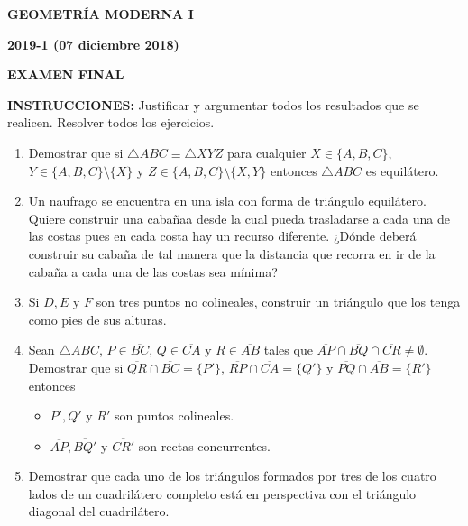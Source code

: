 \documentclass[10pt]{report}
\begin{document}
\vspace{3cm}


\begin{center}
\textbf{\LARGE {GEOMETRÍA MODERNA I}}
\end{center}

\begin{center}
\textbf{{\large 2019-1 (07 diciembre 2018)}}
\end{center}

\begin{center}
\textbf{{\large EXAMEN FINAL}}
\end{center}

{\bf INSTRUCCIONES:} Justificar y argumentar todos los resultados que se realicen. Resolver todos los ejercicios.

\begin{enumerate}

\item Demostrar que si $\triangle ABC \equiv \triangle XYZ$ para cualquier $X \in \{A,B,C\}$, $Y \in \{A,B,C\}\setminus \{X\}$ y $Z \in \{A,B,C\}\setminus\{X,Y\}$ entonces $\triangle ABC$ es equilátero.

\item Un naufrago se encuentra en una isla con forma de triángulo equilátero. Quiere construir una
cabañaa desde la cual pueda trasladarse a cada una de las costas pues en cada costa hay un
recurso diferente. ¿Dónde deberá construir su cabaña de tal manera que la distancia que
recorra en ir de la cabaña a cada una de las costas sea mínima?

\item Si $D, E$ y $F$ son tres puntos no colineales, construir un triángulo que los tenga como pies de sus alturas.

\item Sean $\triangle ABC$, $P \in \overline{BC}$, $Q \in \overline{CA}$ y $R \in \overline{AB}$ tales que $\overline{AP}\cap \overline{BQ}\cap \overline{CR}\neq \emptyset$. Demostrar que si $\overline{QR} \cap \overline {BC}= \{P'\}$, $\overline{RP}\cap \overline {CA}= \{Q'\}$ y $\overline{PQ} \cap \overline {AB}= \{R'\}$ entonces
\begin{itemize}
\item  $P',Q'$ y $R'$ son puntos colineales.
\item $\overline{AP}, \overline{BQ'}$ y $\overline{CR'}$ son rectas concurrentes.
\end{itemize}

\item Demostrar que cada uno de los triángulos formados por tres de los cuatro lados de un cuadrilátero completo está en perspectiva con el triángulo diagonal del cuadrilátero.
\end{enumerate}
\end{document}
